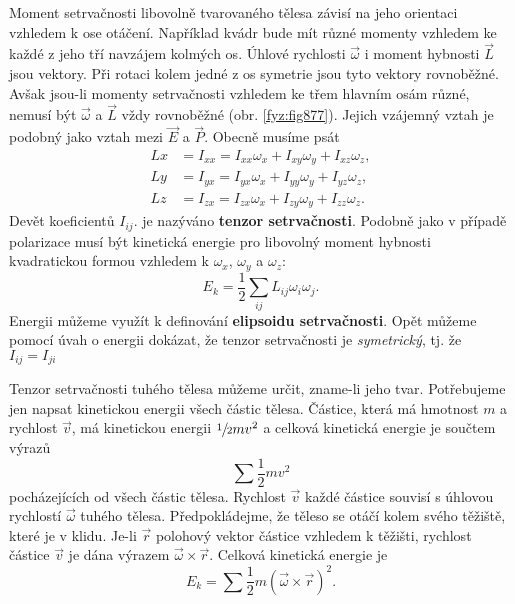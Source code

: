     Moment setrvačnosti libovolně tvarovaného tělesa závisí na jeho orientaci vzhledem k ose
    otáčení. Například kvádr bude mít různé momenty vzhledem ke každé z jeho tří navzájem kolmých
    os. Úhlové rychlosti \(\vec{ω}\) i moment hybnosti \(\vec{L}\) jsou vektory. Při rotaci kolem
    jedné z os symetrie jsou tyto vektory rovnoběžné. Avšak jsou-li momenty setrvačnosti vzhledem ke
    třem hlavním osám různé, nemusí být \(\vec{ω}\) a \(\vec{L}\) vždy rovnoběžné (obr.
    \ref{fyz:fig877}). Jejich vzájemný vztah je podobný jako vztah mezi \(\vec{E}\) a \(\vec{P}\).
    Obecně musíme psát
    \begin{align}
      Lx&=I_{xx}=I_{xx}ω_x+I_{xy}ω_y+I_{xz}ω_z,  \nonumber         \\
      Ly&=I_{yx}=I_{yx}ω_x+I_{yy}ω_y+I_{yz}ω_z,  \label{fyz:eq944} \\
      Lz&=I_{zx}=I_{zx}ω_x+I_{zy}ω_y+I_{zz}ω_z.  \nonumber 
    \end{align}
    Devět koeficientů \(I_{ij}\). je nazýváno \textbf{tenzor setrvačnosti}. Podobně jako v případě
    polarizace musí být kinetická energie pro libovolný moment hybnosti kvadratickou formou vzhledem
    k \(ω_x\), \(ω_y\) a \(ω_z\):
    \begin{equation}\label{fyz:eq945}
      E_k = \frac{1}{2}\sum_{ij}L_{ij}ω_iω_j.
    \end{equation}
    Energii můžeme využít k definování \textbf{elipsoidu setrvačnosti}. Opět můžeme pomocí úvah o
    energii dokázat, že tenzor setrvačnosti je \emph{symetrický}, tj. že \(I_{ij} = I_{ji}\)

    Tenzor setrvačnosti tuhého tělesa můžeme určit, zname-li jeho tvar. Potřebujeme jen napsat
    kinetickou energii všech částic tělesa. Částice, která má hmotnost \(m\) a rychlost \(\vec{v}\),
    má kinetickou energii \(\sfrac{1}{2}mv^2\) a celková kinetická energie je součtem výrazů
    \[\sum\frac{1}{2}mv^2\] pocházejících od všech částic tělesa. Rychlost \(\vec{v}\) každé částice
    souvisí s úhlovou rychlostí \(\vec{ω}\) tuhého tělesa. Předpokládejme, že těleso se otáčí kolem
    svého těžiště, které je v klidu. Je-li \(\vec{r}\) polohový vektor částice vzhledem k těžišti,
    rychlost částice \(\vec{v}\) je dána výrazem \(\vec{ω}\times\vec{r}\). Celková kinetická energie
    je
    \begin{equation}\label{fyz:eq948}
      E_k = \sum\frac{1}{2}m\left(\vec{ω}\times\vec{r}\right)^2.
    \end{equation}

    
